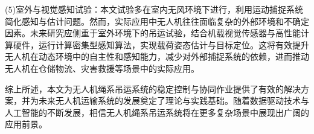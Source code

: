 \documentclass[lang=chs, degree=master, blindreview=false, winfonts=true]{yanputhesis}
\begin{document}
(5)室外与视觉感知试验：本文试验多在室内无风环境下进行，利用运动捕捉系统简化感知与估计问题。然而，实际应用中无人机往往面临复杂的外部环境和不确定因素。未来研究应侧重于室外环境下的吊运试验，结合机载视觉传感器与高性能计算硬件，运行计算密集型感知算法，实现载荷姿态估计与目标定位。这将有效提升无人机在动态环境中的自主性和感知能力，减少对外部捕捉系统的依赖，进而推动无人机在仓储物流、灾害救援等场景中的实际应用。

综上所述，本文为无人机绳系吊运系统的稳定控制与协同作业提供了有效的解决方案，并为未来无人机运输系统的发展奠定了理论与实践基础。随着数据驱动技术与人工智能的不断发展，相信无人机绳系吊运系统将在更多复杂场景中展现出广阔的应用前景。





\backmatter                                                 %
%
\end{document}
